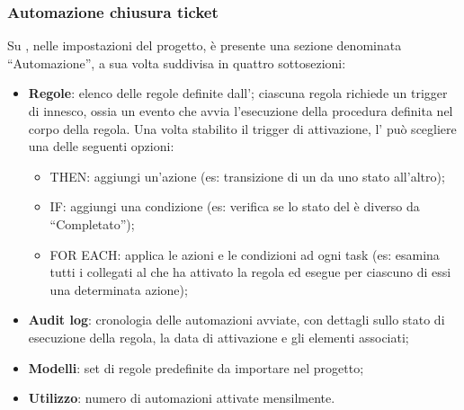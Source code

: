 \subsubsection{Automazione chiusura ticket}
\par Su , nelle impostazioni del progetto, è presente una sezione denominata “Automazione”, a sua volta suddivisa in quattro sottosezioni:
\begin{itemize}
  \item \textbf{Regole}: elenco delle regole definite dall'\Amministratore{}; ciascuna regola richiede un trigger di innesco, ossia un evento che avvia l'esecuzione della procedura definita nel corpo della regola. Una volta stabilito il trigger di attivazione, l’\Amministratore{} può scegliere una delle seguenti opzioni:
  \begin{itemize}
    \item THEN: aggiungi un'azione (es: transizione di un  da uno stato all'altro);
    \item IF: aggiungi una condizione (es: verifica se lo stato del  è diverso da “Completato”);
    \item FOR EACH: applica le azioni e le condizioni ad ogni task (es: esamina tutti i  collegati al  che ha attivato la regola ed esegue per ciascuno di essi una determinata azione);
  \end{itemize}
  \item \textbf{Audit log}: cronologia delle automazioni avviate, con dettagli sullo stato di esecuzione della regola, la data di attivazione e gli elementi associati;
  \item \textbf{Modelli}: set di regole predefinite da importare nel progetto;
  \item \textbf{Utilizzo}: numero di automazioni attivate mensilmente.
\end{itemize}

